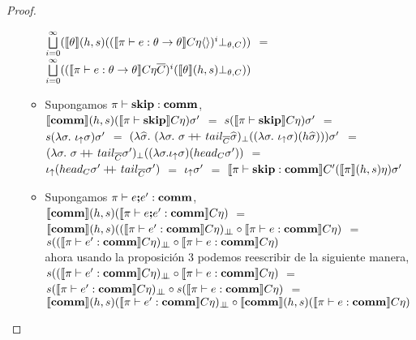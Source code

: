 \begin{proof}
\begin{itemize}
\begin{itemize}
$\bigsqcup\limits^{\infty}_{i=0}(
\llbracket \theta \rrbracket(h,s)(
	(\llbracket \pi \vdash e : \theta \rightarrow \theta \rrbracket C\eta\langle  \rangle)^i \bot_{\theta,C})
)$ $=$\\
$\bigsqcup\limits^{\infty}_{i=0}(
(\llbracket \pi \vdash e : \theta \rightarrow \theta \rrbracket C\eta\overline{C})^i 
				(\llbracket \theta \rrbracket(h,s)\bot_{\theta,C})
)$\\

\item Supongamos $\pi \vdash \textbf{skip} : \textbf{comm}$,\\

$\llbracket \textbf{comm} \rrbracket(h,s)(\llbracket \pi \vdash \textbf{skip} \rrbracket C\eta)\sigma'$ $=$
$s(\llbracket \pi \vdash \textbf{skip} \rrbracket C\eta)\sigma'$ $=$\\
$s(\lambda \sigma . \ \iota_{\uparrow} \sigma)\sigma'$ $=$
$(\lambda \sigmahat . \ (\lambda \sigma. \ 
			\sigma \concat tail_{\overline{C}}\sigmahat)_{\bot}
		((\lambda \sigma . \ \iotabot \sigma)(h \sigmahat)))\sigma'$ $=$\\
$(\lambda \sigma. \ \sigma +\kern-1.3ex+\kern0.8ex tail_{\overline{C}}\sigma')_{\bot}
		((\lambda \sigma . \iota_{\uparrow} \sigma)(head_{C} \sigma'))$ $=$\\
$\iota_{\uparrow} (head_{C} \sigma' +\kern-1.3ex+\kern0.8ex tail_{\overline{C}}\sigma')$ $=$ $\iota_{\uparrow} \sigma'$ $=$
$\llbracket \pi \vdash \textbf{skip} : \textbf{comm} \rrbracket C'(\llbracket \pi \rrbracket(h,s)\eta)\sigma'$\\

\item Supongamos $\pi \vdash e \textbf{;} e' : \textbf{comm}$,\\

$\llbracket \textbf{comm} \rrbracket(h,s)(\llbracket \pi \vdash e \textbf{;} e' : \textbf{comm} \rrbracket C\eta)$ $=$\\
$\llbracket \textbf{comm} \rrbracket(h,s)
	((\llbracket \pi \vdash e' : \textbf{comm} \rrbracket C\eta)_{\bot \!\!\! \bot} 
	\circ
	\llbracket \pi \vdash e : \textbf{comm} \rrbracket C\eta
	)$ $=$ \\
$s((\llbracket \pi \vdash e' : \textbf{comm} \rrbracket C\eta)_{\bot \!\!\! \bot} 
	\circ
	\llbracket \pi \vdash e : \textbf{comm} \rrbracket C\eta
	)$\\

ahora usando la proposici\'on 3 podemos reescribir de la siguiente manera,\\

$s((\llbracket \pi \vdash e' : \textbf{comm} \rrbracket C\eta)_{\bot \!\!\! \bot} 
	\circ
	\llbracket \pi \vdash e : \textbf{comm} \rrbracket C\eta
	)$ $=$\\
$s(\llbracket \pi \vdash e' : \textbf{comm} \rrbracket C\eta)_{\bot \!\!\! \bot} 
	\circ
	s(\llbracket \pi \vdash e : \textbf{comm} \rrbracket C\eta)$ $=$\\
$\llbracket \textbf{comm} \rrbracket(h,s)(\llbracket \pi \vdash e' : \textbf{comm} \rrbracket C\eta)_{\bot \!\!\! \bot} 
	\circ
 \llbracket \textbf{comm} \rrbracket(h,s)(\llbracket \pi \vdash e : \textbf{comm} \rrbracket C\eta)$\\


\end{itemize}
\end{itemize}
\end{proof}
